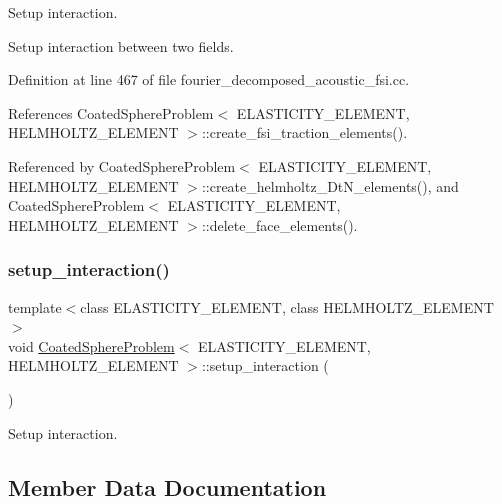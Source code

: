 Setup interaction. 

Setup interaction between two fields. 

Definition at line 467 of file fourier\+\_\+decomposed\+\_\+acoustic\+\_\+fsi.\+cc.



References Coated\+Sphere\+Problem$<$ E\+L\+A\+S\+T\+I\+C\+I\+T\+Y\+\_\+\+E\+L\+E\+M\+E\+N\+T, H\+E\+L\+M\+H\+O\+L\+T\+Z\+\_\+\+E\+L\+E\+M\+E\+N\+T $>$\+::create\+\_\+fsi\+\_\+traction\+\_\+elements().



Referenced by Coated\+Sphere\+Problem$<$ E\+L\+A\+S\+T\+I\+C\+I\+T\+Y\+\_\+\+E\+L\+E\+M\+E\+N\+T, H\+E\+L\+M\+H\+O\+L\+T\+Z\+\_\+\+E\+L\+E\+M\+E\+N\+T $>$\+::create\+\_\+helmholtz\+\_\+\+Dt\+N\+\_\+elements(), and Coated\+Sphere\+Problem$<$ E\+L\+A\+S\+T\+I\+C\+I\+T\+Y\+\_\+\+E\+L\+E\+M\+E\+N\+T, H\+E\+L\+M\+H\+O\+L\+T\+Z\+\_\+\+E\+L\+E\+M\+E\+N\+T $>$\+::delete\+\_\+face\+\_\+elements().

\mbox{\label{classCoatedSphereProblem_aeea43c892871a6c65df992aedc3b3547}} 
\subsubsection{\texorpdfstring{setup\+\_\+interaction()}{setup\_interaction()}\hspace{0.1cm}{\footnotesize\ttfamily [2/2]}}
{\footnotesize\ttfamily template$<$class E\+L\+A\+S\+T\+I\+C\+I\+T\+Y\+\_\+\+E\+L\+E\+M\+E\+NT, class H\+E\+L\+M\+H\+O\+L\+T\+Z\+\_\+\+E\+L\+E\+M\+E\+NT$>$ \\
void \hyperlink{classCoatedSphereProblem}{Coated\+Sphere\+Problem}$<$ E\+L\+A\+S\+T\+I\+C\+I\+T\+Y\+\_\+\+E\+L\+E\+M\+E\+NT, H\+E\+L\+M\+H\+O\+L\+T\+Z\+\_\+\+E\+L\+E\+M\+E\+NT $>$\+::setup\+\_\+interaction (\begin{DoxyParamCaption}{ }\end{DoxyParamCaption})\hspace{0.3cm}{\ttfamily [private]}}



Setup interaction. 



\subsection{Member Data Documentation}
\mbox{\label{classCoatedSphereProblem_a4bb400e47b8d3713bfd5e27ae2c89683}} 
